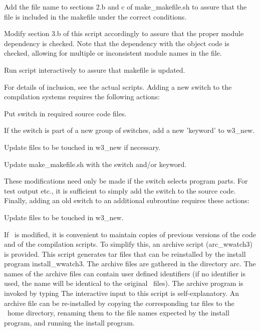 \begin{list}{)\hfill}
            { \leftmargin 15mm 
             \rightmargin 5mm \itemsep 0mm \parsep 0mm}
\item Add the file name to sections 2.b and c of {\file make\_makefile.sh} to
      assure that the file is included in the makefile under the correct
      conditions.
\item Modify section 3.b of this script accordingly to assure that the proper
      module dependency is checked. Note that the dependency with the object
      code is checked, allowing for multiple or inconsistent module names in
      the file.
\item Run script interactively to assure that makefile is updated.
\end{list}

\noindent
For details of inclusion, see the actual scripts. Adding a new switch to the
compilation systems requires the following actions:

\begin{list}{)\hfill}
            { \leftmargin 15mm 
             \rightmargin 5mm \itemsep 0mm \parsep 0mm}
\item Put switch in required source code files.
\item If the switch is part of a new group of switches, add a new
      'keyword' to {\file w3\_new}.
\item Update files to be touched in {\file w3\_new} if necessary.
\item Update {\file make\_makefile.sh} with the switch and/or keyword.
\end{list}

\noindent
These modifications need only be made if the switch selects program parts. For
test output etc., it is sufficient to simply add the switch to the source
code. Finally, adding an old switch to an additional subroutine requires these
actions:

\begin{list}{)\hfill}
            { \leftmargin 15mm 
             \rightmargin 5mm \itemsep 0mm \parsep 0mm}
\item Update files to be touched in {\file w3\_new}.
\end{list}

If \ws\ is modified, it is convenient to maintain copies of previous versions
of the code and of the compilation scripts. To simplify this, an archive
script ({\file arc\_wwatch3}) is provided. This script generates {\file tar}
files that can be reinstalled by the install program {\file
install\_wwatch3}. The archive files are gathered in the directory {\dir
arc}. The names of the archive files can contain user defined identifiers (if
no identifier is used, the name will be identical to the original \ws\
files). The archive program is invoked by typing 
\noindent
The interactive input to this script is self-explanatory. An archive file can
be re-installed by copying the corresponding {\file tar} files to the \ws\
home directory, renaming them to the file names expected by the install
program, and running the install program.


